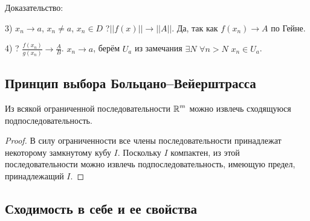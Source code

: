 Доказательство:

3) $x_n \rightarrow a$, $x_n \neq a$, $x_n \in D$ ?$||f(x)|| \rightarrow ||A||$. Да, так как $f(x_n) \rightarrow A$ по Гейне.

4) ? $\frac{f(x_n)}{g(x_n)} \rightarrow \frac{A}{B}$. $x_n \rightarrow a$, берём $U_a$ из
замечания $\exists N$ $\forall n > N$ $x_n \in U_a$. %

\newpage
\subsection{Принцип выбора Больцано--Вейерштрасса}

\begin{theorem*}
Из всякой ограниченной последовательности $\operatorname*{\mathbb{R}}^m$ можно извлечь сходящуюся подпоследовательность.
\end{theorem*}
\begin{proof}
В силу ограниченности все члены последовательности принадлежат некоторому замкнутому кубу $I$. Поскольку $I$ компактен, из этой последовательности можно извлечь подпоследовательность, имеющую предел, принадлежащий $I$.
\end{proof}

\newpage
\subsection{Сходимость в себе и ее свойства} %


